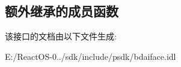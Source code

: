 \subsection*{额外继承的成员函数}


该接口的文档由以下文件生成\+:\begin{DoxyCompactItemize}
\item 
E\+:/\+React\+O\+S-\/0../sdk/include/psdk/bdaiface.\+idl\end{DoxyCompactItemize}
